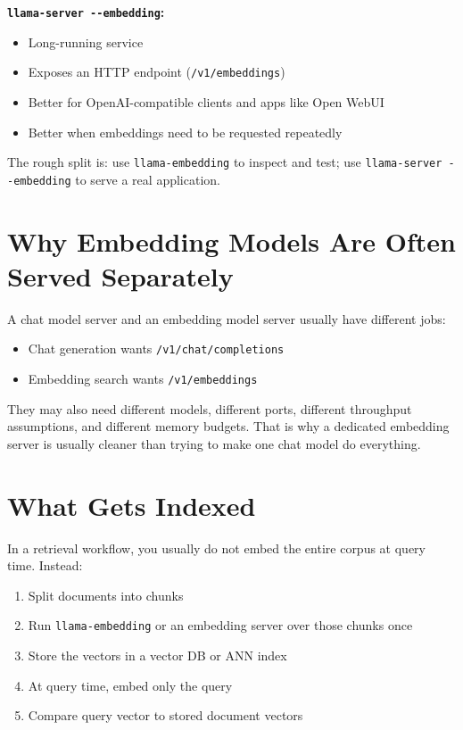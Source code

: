 \textbf{\texttt{llama-server -{}-embedding}:}

\begin{itemize}
    \item Long-running service
    \item Exposes an HTTP endpoint (\texttt{/v1/embeddings})
    \item Better for OpenAI-compatible clients and apps like Open WebUI
    \item Better when embeddings need to be requested repeatedly
\end{itemize}

The rough split is: use \texttt{llama-embedding} to inspect and test; use
\texttt{llama-server -{}-embedding} to serve a real application.

\section{Why Embedding Models Are Often Served Separately}

A chat model server and an embedding model server usually have different jobs:

\begin{itemize}
    \item Chat generation wants \texttt{/v1/chat/completions}
    \item Embedding search wants \texttt{/v1/embeddings}
\end{itemize}

They may also need different models, different ports, different throughput assumptions, and
different memory budgets. That is why a dedicated embedding server is usually cleaner than
trying to make one chat model do everything.

\section{What Gets Indexed}

In a retrieval workflow, you usually do not embed the entire corpus at query time. Instead:

\begin{enumerate}
    \item Split documents into chunks
    \item Run \texttt{llama-embedding} or an embedding server over those chunks once
    \item Store the vectors in a vector DB or ANN index
    \item At query time, embed only the query
    \item Compare query vector to stored document vectors
\end{enumerate}


